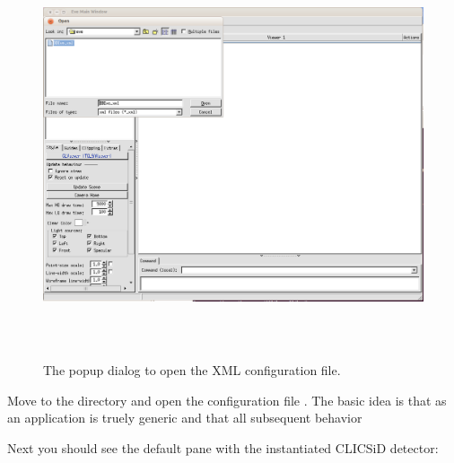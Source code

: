 \documentclass[10pt,a4paper]{article}
\begin{document}
\begin{figure}[h]
  \begin{center}
    \includegraphics[height=120mm] {DDEve_2}
    \caption{The \DDE popup dialog to open the XML configuration file.}
    \label{fig:DDEve_2}
  \end{center}
\end{figure}

\noindent
Move to the directory  and open the 
\DDE configuration file . The basic idea is that \DDE as an 
application is truely generic and that all subsequent behavior 


\newpage
\noindent
Next you should see the default pane with the instantiated CLICSiD detector:
\end{document}
